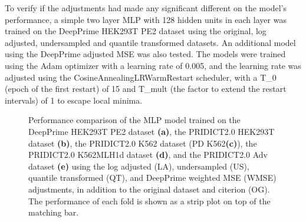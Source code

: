 To verify if the adjustments had made any significant different on the model's performance, a simple two layer MLP with 128 hidden units in each layer was trained on the DeepPrime HEK293T PE2 dataset using the original, log adjusted, undersampled and quantile transformed datasets. An additional model using the DeepPrime adjusted MSE was also tested. The models were trained using the Adam optimizer with a learning rate of 0.005, and the learning rate was adjusted using the CosineAnnealingLRWarmRestart scheduler, with a T\_0 (epoch of the first restart) of 15 and T\_mult (the factor to extend the restart intervals) of 1 to escape local minima. 

\begin{figure}
    \centering
    \vspace{-3mm} %
    \vspace{-3mm}
    \vspace{-3mm}
    \vspace{-3mm}
    \vspace{-3mm}
    \caption{Performance comparison of the MLP model trained on the DeepPrime HEK293T PE2 dataset \textbf{(a)}, the PRIDICT2.0 HEK293T dataset \textbf{(b)}, the PRIDICT2.0 K562 dataset (PD K562\textbf{(c)}), the PRIDICT2.0 K562MLH1d dataset \textbf{(d)}, and the PRIDICT2.0 Adv dataset \textbf{(e)} using the log adjusted (LA), undersampled (US), quantile transformed (QT), and DeepPrime weighted MSE (WMSE) adjustments, in addition to the original dataset and citerion (OG). 
    The performance of each fold is shown as a strip plot on top of the matching bar.}
    \label{fig:adjustment-performance}
\end{figure}

